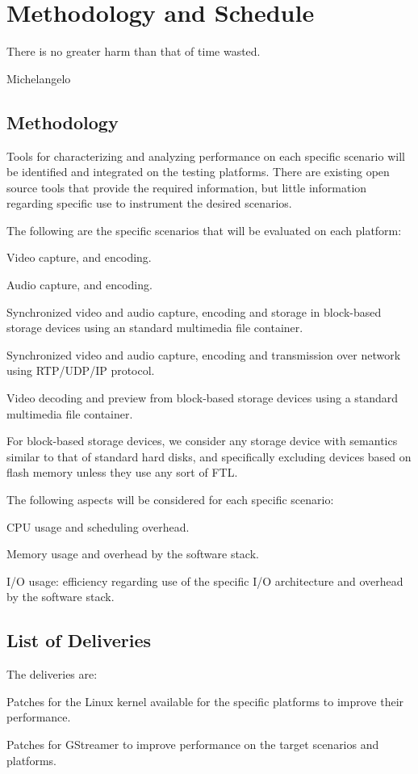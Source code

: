 \chapter{Methodology and Schedule} 
\epigraph{There is no greater harm than that of time wasted.}{Michelangelo}

\section{Methodology}
Tools for characterizing and analyzing performance on each specific scenario will be identified and integrated on the testing platforms. There are existing open source tools that provide the required information, but little information regarding specific use to instrument the desired scenarios.

The following are the specific scenarios that will be evaluated on each platform:
\begin{itemize*}
\item Video capture, and encoding.
\item Audio capture, and encoding.
\item Synchronized video and audio capture, encoding and storage in block-based storage devices using an standard multimedia file container.
\item Synchronized video and audio capture, encoding and transmission over network using RTP/UDP/IP protocol.
\item Video decoding and preview from block-based storage devices using a standard multimedia file container.
\end{itemize*}

For block-based storage devices, we consider any storage device with semantics similar to that of standard hard disks, and specifically excluding devices based on flash memory unless they use any sort of \ac{FTL}.

The following aspects will be considered for each specific scenario:
\begin{itemize*}
\item CPU usage and scheduling overhead.
\item Memory usage and overhead by the software stack.
\item I/O usage: efficiency regarding use of the specific I/O architecture and overhead by the software stack.
\end{itemize*}

\section{List of Deliveries}
The deliveries are:
\begin{enumerate*}
\item Patches for the Linux kernel available for the specific platforms to improve their performance.
\item Patches for GStreamer to improve performance on the target scenarios and platforms.
\end{enumerate*}

